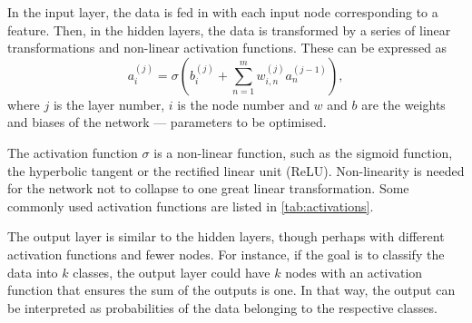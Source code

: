 In the input layer, the data is fed in with each input node corresponding to a feature.
Then, in the hidden layers, the data is transformed by a series of linear transformations and non-linear activation functions.
These can be expressed as
\begin{equation}
    \label{eq:nn}
    a_i^{(j)} = \sigma\left( b^{(j)}_i + \sum_{n=1}^m w^{(j)}_{i,n} a^{(j-1)}_n\right),
\end{equation}
where $j$ is the layer number, $i$ is the node number and $w$ and $b$ are the weights and biases of the network — parameters to be optimised.

The activation function $\sigma$ is a non-linear function, such as the sigmoid function, the hyperbolic tangent or the rectified linear unit (ReLU).
Non-linearity is needed for the network not to collapse to one great linear transformation.
Some commonly used activation functions are listed in \cref{tab:activations}.

The output layer is similar to the hidden layers, though perhaps with different activation functions and fewer nodes.
For instance, if the goal is to classify the data into $k$ classes, the output layer could have $k$ nodes with an activation function that ensures the sum of the outputs is one.
In that way, the output can be interpreted as probabilities of the data belonging to the respective classes.

